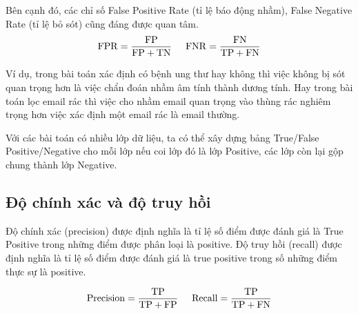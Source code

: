 Bên cạnh đó, các chỉ số False Positive Rate (tỉ lệ báo động nhầm), False Negative Rate (tỉ lệ bỏ sót) cũng đáng được quan tâm. 
\begin{equation}
	\mathrm{FPR} = \mathrm{\frac{FP}{FP + TN}} \hspace{0.5cm}
	\mathrm{FNR} = \mathrm{\frac{FN}{TP + FN}}
\end{equation} 

Ví dụ, trong bài toán xác định có bệnh ung thư hay không thì việc không bị sót quan trọng hơn là việc chẩn đoán nhầm âm tính thành dương tính. Hay trong bài toán lọc email rác thì việc cho nhầm email quan trọng vào thùng rác nghiêm trọng hơn việc xác định một email rác là email thường. \par

Với các bài toán có nhiều lớp dữ liệu, ta có thể xây dựng bảng True/False Positive/Negative cho mỗi lớp nếu coi lớp đó là lớp Positive, các lớp còn lại gộp chung thành lớp Negative.


\subsection{Độ chính xác và độ truy hồi }
Độ chính xác (precision) được định nghĩa là tỉ lệ số điểm được đánh giá là True Positive trong những điểm được phân loại là positive.
Độ truy hồi (recall) được định nghĩa là tỉ lệ số điểm được đánh giá là true positive trong số những điểm thực sự là positive. 

\begin{equation}
    \mathrm{Precision = \frac{TP}{TP + FP}} \hspace{0.5cm}
    \mathrm{Recall = \frac{TP}{TP + FN}}
\end{equation}

